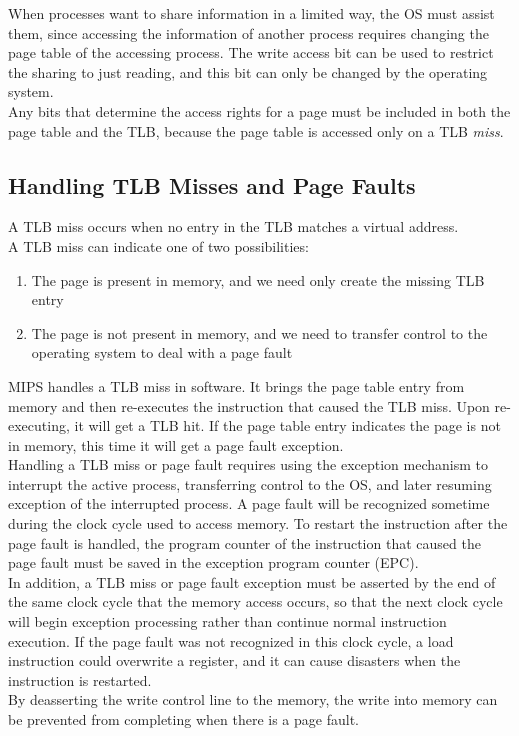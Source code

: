 \documentclass[12pt]{article}
\theoremstyle{definition}
\begin{document}
  When processes want to share information in a limited way, the OS must assist them, since accessing the information of another process requires changing the page table of the accessing process.
  The write access bit can be used to restrict the sharing to just reading, and this bit can only be changed by the operating system. \\
  Any bits that determine the access rights for a page must be included in both the page table and the TLB, because the page table is accessed only on a TLB \emph{miss}.

  \subsection{Handling TLB Misses and Page Faults}
  A TLB miss occurs when no entry in the TLB matches a virtual address. \\
  A TLB miss can indicate one of two possibilities:
  \begin{enumerate}
    \item The page is present in memory, and we need only create the missing TLB entry
    \item The page is not present in memory, and we need to transfer control to the operating system to deal with a page fault
  \end{enumerate}

  MIPS handles a TLB miss in software.
  It brings the page table entry from memory and then re-executes the instruction that caused the TLB miss.
  Upon re-executing, it will get a TLB hit.
  If the page table entry indicates the page is not in memory, this time it will get a page fault exception. \\

  Handling a TLB miss or page fault requires using the exception mechanism to interrupt the active process, transferring control to the OS, and later resuming exception of the interrupted process.
  A page fault will be recognized sometime during the clock cycle used to access memory.
  To restart the instruction after the page fault is handled, the program counter of the instruction that caused the page fault must be saved in the exception program counter (EPC). \\

  In addition, a TLB miss or page fault exception must be asserted by the end of the same clock cycle that the memory access occurs, so that the next clock cycle will begin exception processing rather than continue normal instruction execution.
  If the page fault was not recognized in this clock cycle, a load instruction could overwrite a register, and it can cause disasters when the instruction is restarted. \\
  By deasserting the write control line to the memory, the write into memory can be prevented from completing when there is a page fault. \\
\end{document}
